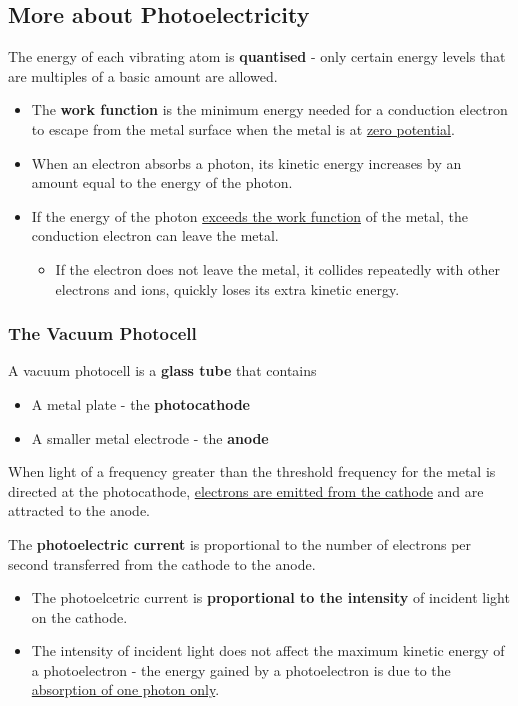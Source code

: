 \subsection{More about Photoelectricity}

The energy of each vibrating atom is \textbf{quantised} - only certain energy levels that are multiples of a basic amount are allowed.
\begin{itemize}
    \item The \textbf{work function} is the minimum energy needed for a conduction electron to escape from the metal surface when the metal is at \underline{zero potential}.
    \item When an electron absorbs a photon, its kinetic energy increases by an amount equal to the energy of the photon.
    \item If the energy of the photon \underline{exceeds the work function} of the metal, the conduction electron can leave the metal.
        \begin{itemize}
            \item If the electron does not leave the metal, it collides repeatedly with other electrons and ions, quickly loses its extra kinetic energy.
        \end{itemize}
\end{itemize}

\subsubsection*{The Vacuum Photocell}

A vacuum photocell is a \textbf{glass tube} that contains
\begin{itemize}
    \item A metal plate - the \textbf{photocathode}
    \item A smaller metal electrode - the \textbf{anode}
\end{itemize}
When light of a frequency greater than the threshold frequency for the metal is directed at the photocathode, \underline{electrons are emitted from the cathode} and are attracted to the anode.

The \textbf{photoelectric current} is proportional to the number of electrons per second transferred from the cathode to the anode.
\begin{itemize}
    \item The photoelcetric current is \textbf{proportional to the intensity} of incident light on the cathode.
    \item The intensity of incident light does not affect the maximum kinetic energy of a photoelectron - the energy gained by a photoelectron is due to the \underline{absorption of one photon only}.
\end{itemize}
